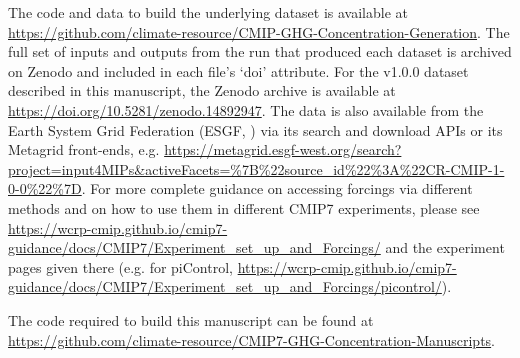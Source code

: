 The code and data to build the underlying dataset is available at
\newline \mbox{\url{https://github.com/climate-resource/CMIP-GHG-Concentration-Generation}}.
The full set of inputs and outputs from the run that produced each dataset is archived on Zenodo
and included in each file's `doi' attribute.
For the v1.0.0 dataset described in this manuscript, the Zenodo archive is available at
\url{https://doi.org/10.5281/zenodo.14892947}.
The data is also available from the Earth System Grid Federation (ESGF, \citealp{esgf_docs_2025})
via its search and download APIs or its Metagrid front-ends, e.g.
\url{https://metagrid.esgf-west.org/search?project=input4MIPs&activeFacets=\%7B\%22source_id\%22\%3A\%22CR-CMIP-1-0-0\%22\%7D}.
For more complete guidance on accessing forcings via different methods
and on how to use them in different CMIP7 experiments, please see
\newline \mbox{\url{https://wcrp-cmip.github.io/cmip7-guidance/docs/CMIP7/Experiment_set_up_and_Forcings/}}
and the experiment pages given there
\newline (e.g. for piControl, \mbox{\url{https://wcrp-cmip.github.io/cmip7-guidance/docs/CMIP7/Experiment_set_up_and_Forcings/picontrol/}}).

The code required to build this manuscript can be found at
\url{https://github.com/climate-resource/CMIP7-GHG-Concentration-Manuscripts}.
